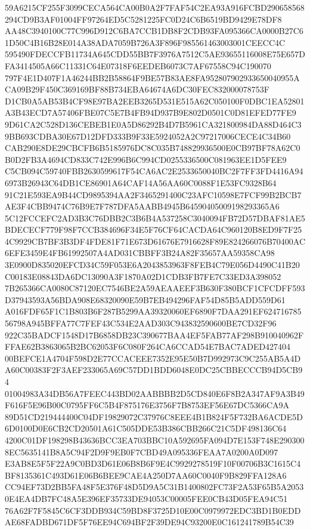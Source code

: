 \documentclass[UTF8,fontset=fandol,zihao=-4,a4paper]{ctexart}
\begin{document}
{{59A6215CF255F3099CECA564CA00B0A2F7FAF54C2EA93A916FCBD290658568294CD9B3AF01004FF97264ED5C5281225FC0D24C6B6519BD9429E78DF8
AA48C3940100C77C996D912C6BA7CCB1DB8F2CDB93FA095366CA0000B27C61D50C4B16B28E014A38ADA7059B726A3F896F985561463003001CEECC4C
595490FDECCFB11734A645CDD55BB7F3976A7512C5AE93655116008E75E657DFA3414505A66C11331C64E07318F6EEDEB6073C7AF67558C94C190070
797F4E1D407F1A46244BB2B58864F9BE57B83AE8FA952807902933650040955ACA09B29F450C369169BF88B734EBA64674A6DC30FEC832000078753F
D1CB0A5AB53B4CF98E97BA2EEB3265D531E515A62C050100F0DBC1EA52801A3B43ECD7A57406FBE07C5E7B4FB94D937B9E802D0501C0D81EFED77FE9
9D61CA2C528D136CEBEB1E0A5D86292B4D7B5961CA321800984DA88D464C39BB693CDBA30E67D12DFD333B9F33E5924052A2C97217006CECE4C34B60
CAB290E8DE29CBCFB6B5185976DC8C035B748829936500E0CB97BF78A62C0B0D2FB3A4694CD833C742E996B6C994CD0255336500C081963EE1D5FEE9
C5CB094C59740FBB2630599617F54CA6AC2E2533650040BC2F7FF3FD4416A946973B26943C64DB1CE86901A64CAF14A56AA60C0088F1E53FC9328B64
91C21E593EA9B44CD9895394AA2F3465291400C23AFC10598E7FCF99B2BCB7AE3F4CBB9474C76B9E7F787DFA5AABB4945B64590405009198293365A6
5C12FCCEFC2AD3B3C76DBB2C3B6B4A537258C3040094FB72D57DBAF81AE5BDECECF779F98F7CCB384696F34E5F76CF64CACDA64C960120B8ED9F7F25
4C9929CB7BF3B3DF4FDE81F71E673D61676E7916628F89E824266076B70400AC6EFE3459E4FB61992507A4AD031CBBFF3B24A82F35657AA59358CA98
3E0900D835020EFCD34C59F053E6A2043853963F8FEB4C79E056D4490C41B20C00183E08843DA6DC13090A3F1870A02D1CDB3FB7FE7C33ED3A398052
7B265366CA0080C87120EC7546BE2A59AEAAEEF3B630F380BCF1CFCDFF593D37943593A56BDA908E68320090E59B7EB494296FAF54D85B5ADD559D61
A016FDF65F1C1B803B6F287B5299AA39320060EF6890F7DAA291EF62471678556798A945BFFA77C7FEF43C534E2AAD303C943832590600BE7CD32F96
922C35BADCF1548D17B6858DB23C390677BAA4EF5FAB77AF298B910040962FFFAE62B3863065B2BC62053F6C080F264CA6CCAD54E7BAC7ADED427404
00BEFCE1A4704F598D2E77CCACEEE7352E95E50B7D992973C9C255AB5A4DA60C00383F2F3AEF233065A69C57DD1BDD6048E0DC25CBBECCCB94D5CB94
01004983A34DB56A7FEEC443BD02AABBBB2D5CD840E6F8B2A347AF9A3B49F616F5E96B00C0795FF6C5B4F875176E3756F7B8753EF56E67DC5366CA9A
89D51CD219444400C04DF19829072C37976C8EEE4B1B824F5F732BA6ACDE5D6D0100D0E6CB2CD20501A61C505DDE53B386CBB266C21C5DF498136C64
4200C01DF198298B43636BCC3EA703BBC10A592695FA094D7E153F748E2903008EC5635141B8A5C94F2D9F9EB0F7CBD49A095336FEAA7A0200A0D097
E3AB8E5F5F22A9C0BD3D61E06B8B6F9E4C9929278519F10F00706B3C1615C4BF8135361C493D61E06B6BEE9CAE4A250D7AA60C0040F9B829FFA128A6
CC94EF73D2BB5FA48F5E376F48D5D9A5C31B1400802FC73F2A53F65B5A20530E4EA4DB7FC48A5E396EF35733DE94053C00005FEE0CB43D05FEA94C51
76A62F7F5845C6CF3DDB934C59BD8F3725D10E00C0979972EDC3BD1B0EDDAE68FADBD671DF5F76EE94C694BF2F39DE94C93200E0C161241789B54C39
}}
\end{document}
